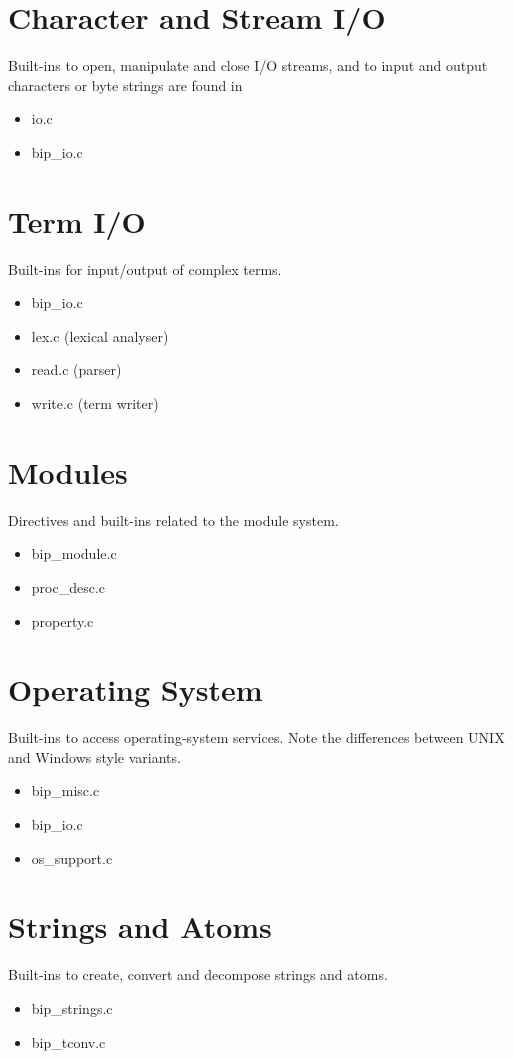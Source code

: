 \section{Character and Stream I/O }
Built-ins to open, manipulate and close I/O streams, and to
input and output characters or byte strings are found in
     \begin{itemize}
     \item io.c
     \item bip_io.c
     \end{itemize}

\section{Term I/O }
Built-ins for input/output of complex terms.
     \begin{itemize}
     \item bip_io.c
     \item lex.c (lexical analyser)
     \item read.c (parser)
     \item write.c (term writer)
     \end{itemize}

\section{Modules }
Directives and built-ins related to the module system.
     \begin{itemize}
     \item bip_module.c
     \item proc_desc.c
     \item property.c
     \end{itemize}

\section{Operating System }
Built-ins to access operating-system services.
Note the differences between UNIX and Windows style variants.
     \begin{itemize}
     \item bip_misc.c
     \item bip_io.c
     \item os_support.c
     \end{itemize}

\section{Strings and Atoms }
     Built-ins to create, convert and decompose strings and atoms.
     \begin{itemize}
     \item bip_strings.c
     \item bip_tconv.c
     \end{itemize}

